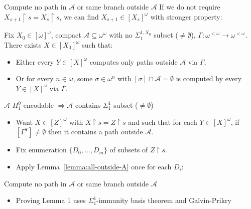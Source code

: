 \begin{frame}{Compute no path in $\mathcal{A}$ or same branch
outside $\mathcal{A}$}
  If we do not require $X_{s+1}\restriction s=X_s\restriction s$, we can
  find $X_{s+1}\in[X_s]^\omega$ with stronger property:

  \begin{lemma}
  \label{lemma:all-outside-A}
    Fix $X_0\in[\omega]^\omega$, compact
    $\mathcal{A}\subseteq\omega^\omega$ with no $\Sigma_1^{1,X_0}$ subset
    ($\neq\emptyset$), $\Gamma:\omega^{<\omega} \rightarrow
    \omega^{<\omega}$. There exists $X\in[X_0]^\omega$ such that:

    \begin{itemize}
      \item Either every $Y\in[X]^\omega$ computes only paths outside
        $\mathcal{A}$ via $\Gamma$,
      \item Or for every $n\in\omega$, some $\sigma\in\omega^n$ with
        $[\sigma]\cap\mathcal{A}=\emptyset$ is computed by every
        $Y\in[X]^\omega$ via $\Gamma$.
    \end{itemize}
  \end{lemma}
\end{frame}

\begin{frame}{$\mathcal{A}$ $\Pi_1^0$-encodable $\Rightarrow \mathcal{A}$
contains $\Sigma_1^1$ subset ($\neq\emptyset$)}
  \begin{itemize}
    \item Want $X\in[Z]^\omega$ with $X\restriction s=Z\restriction s$
      and such that for each $Y\in[X]^\omega$, if $[\Gamma^Y]\neq\emptyset$
      then it contains a path outside $\mathcal{A}$.
    \item Fix enumeration $\{D_0,\ldots,D_m\}$ of subsets of $Z\restriction
      s$.
    \item Apply Lemma~\ref{lemma:all-outside-A} once for each $D_i$:
  \end{itemize}
\end{frame}

\begin{frame}{Compute no path in $\mathcal{A}$ or same branch
  outside $\mathcal{A}$}
  \begin{itemize}
    \item Proving Lemma 1 uses $\Sigma_1^1$-immunity basis theorem and
      Galvin-Prikry
  \end{itemize}
\end{frame}

